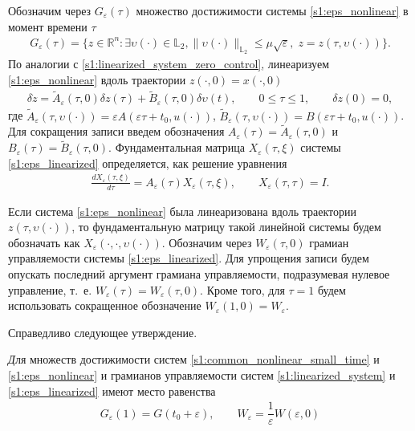 \documentclass[../main.tex]{subfiles}
\begin{document}
Обозначим через $G_{\varepsilon}(\tau)$ множество достижимости системы \eqref{s1:eps_nonlinear} в момент времени $\tau$
\begin{gather*}
 G_{\varepsilon}(\tau) = \{z\in \mathbb{R}^n:\exists \upsilon(\cdot)\in \mathbb{L}_2, \lVert \upsilon(\cdot)\rVert_{\mathbb{L}_2}
 \leqslant \mu \sqrt{\varepsilon}, \; z=z(\tau, \upsilon(\cdot))\}.
\end{gather*}
По аналогии с \eqref{s1:linearized_system_zero_control}, линеаризуем \eqref{s1:eps_nonlinear} вдоль траектории $ z(\cdot,0) = x(\cdot, 0) $
\begin{gather}\label{s1:eps_linearized}
 \delta\dot{z} = \widetilde{A}_{\varepsilon}(\tau, 0) \delta z(\tau) +\widetilde{B}_{\varepsilon}(\tau, 0) \delta \upsilon(t),\qquad 0 \leqslant \tau \leqslant 1, \qquad \delta z(0) = 0,
\end{gather}
где $ \widetilde{A}_{\varepsilon}(\tau, \upsilon(\cdot)) = \varepsilon A(\varepsilon \tau + t_0, u(\cdot)) $, $\widetilde{B}_{\varepsilon}(\tau, \upsilon(\cdot)) = B(\varepsilon \tau + t_0, u(\cdot)) $. 
Для сокращения записи введем обозначения $A_{\varepsilon}(\tau) = \widetilde{A}_{\varepsilon}(\tau, 0)$ и $B_{\varepsilon}(\tau) = \widetilde{B}_{\varepsilon}(\tau, 0)$.
Фундаментальная матрица $ X_{\varepsilon}(\tau,\xi) $ системы \eqref{s1:eps_linearized} определяется, как решение уравнения
\begin{gather*}
 \frac{dX_{\varepsilon}(\tau,\xi)}{d\tau} = A_{\varepsilon}(\tau) X_{\varepsilon}(\tau,\xi), \qquad X_{\varepsilon}(\tau,\tau) = I. 
\end{gather*}

Если система \eqref{s1:eps_nonlinear} была линеаризована вдоль траектории $ z(\tau, \upsilon(\cdot)) $, то фундаментальную матрицу такой линейной системы будем обозначать как $X_{\varepsilon}(\cdot,\cdot, \upsilon(\cdot)) $.
Обозначим через $ W_{\varepsilon}(\tau, 0) $ грамиан управляемости системы \eqref{s1:eps_linearized}. 
Для упрощения записи будем опускать последний аргумент грамиана управляемости, подразумевая нулевое управление, т.~е. $W_{\varepsilon}(\tau) = W_{\varepsilon}(\tau, 0) $.
Кроме того, для $\tau = 1$ будем использовать сокращенное обозначение $W_{\varepsilon}(1, 0) = W_{\varepsilon}$. 

Справедливо следующее утверждение.

\begin{utv}\label{s1:utv:connection_with_scaled_system}
 {\textit Для множеств достижимости систем \eqref{s1:common_nonlinear_small_time} и \eqref{s1:eps_nonlinear} и грамианов управляемости систем \eqref{s1:linearized_system} и \eqref{s1:eps_linearized} имеют место равенства}
 \begin{gather*}
 G_{\varepsilon}(1) = G(t_0 + \varepsilon), \qquad
 W_{\varepsilon} = \dfrac{1}{\varepsilon} W(\varepsilon, 0)
 \end{gather*}
\end{utv}
\end{document}
